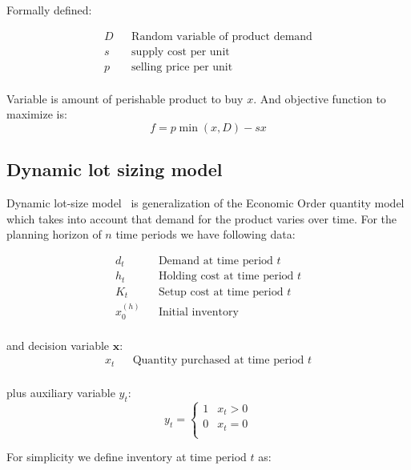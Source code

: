 Formally defined:

\begin{align*}
    D && \text{Random variable of product demand} \\
    s && \text{supply cost per unit} \\
    p && \text{selling price per unit} \\
\end{align*}

Variable is amount of perishable product to buy $x$.
And objective function to maximize is:
\begin{equation*}
    f = p\min(x, D) - sx
\end{equation*}

\subsection{Dynamic lot sizing model}
\label{sec:Dynamic lot sizing model}

Dynamic lot-size model~\autocite{Wagner2004} is generalization of the Economic Order quantity model~\autocite{Harris1990} which takes into account that demand for the product varies over time. For the planning horizon of $n$ time periods we have following data:

\begin{align*}
  d_t && \text{Demand at time period $t$} \\
  h_t && \text{Holding cost at time period $t$} \\
  K_t && \text{Setup cost at time period $t$} \\
  x^{(h)}_0 && \text{Initial inventory} \\
\end{align*}

and decision variable $\mathbf{x}$:
\begin{align*}
  x_t && \text{Quantity purchased at time period $t$}\\
\end{align*}

plus auxiliary variable $y_t$:
\begin{equation*}
    y_t = \begin{cases}
        1 & x_t > 0\\
        0 & x_t = 0 \\
    \end{cases}
\end{equation*}

For simplicity we define inventory at time period $t$ as:

